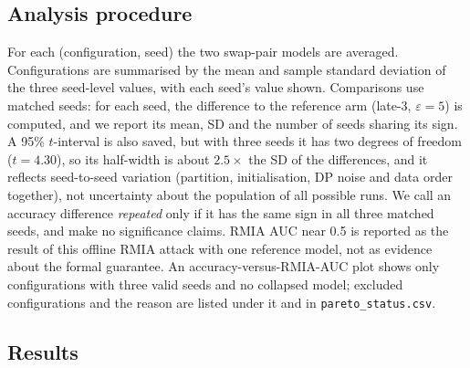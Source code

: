 \documentclass[11pt,a4paper]{article}
\begin{document}
\subsection{Analysis procedure}

For each (configuration, seed) the two swap-pair models are averaged. Configurations are summarised by
the mean and sample standard deviation of the three seed-level values, with each seed's value shown.
Comparisons use matched seeds: for each seed, the difference to the reference arm (late-3, $\varepsilon{=}5$)
is computed, and we report its mean, SD and the number of seeds sharing its sign. A 95\% $t$-interval is also
saved, but with three seeds it has two degrees of freedom ($t = 4.30$), so its half-width is about
$2.5\times$ the SD of the differences, and it reflects seed-to-seed variation (partition, initialisation, DP
noise and data order together), not uncertainty about the population of all possible runs. We call an
accuracy difference \emph{repeated} only if it has the same sign in all three matched seeds, and make no
significance claims. RMIA AUC near 0.5 is reported as the result of this offline RMIA attack with one
reference model, not as evidence about the formal guarantee. An accuracy-versus-RMIA-AUC plot shows
only configurations with three valid seeds and no collapsed model; excluded configurations and the reason
are listed under it and in \texttt{pareto\_status.csv}.

\subsection{Results}

\end{document}
